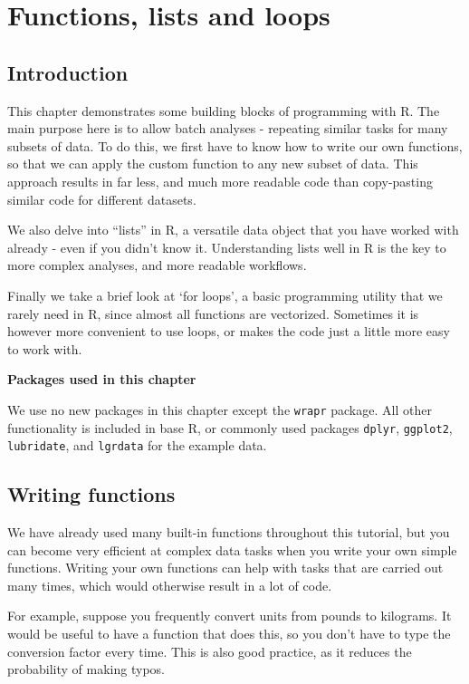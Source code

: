 \documentclass[]{book}
\begin{document}
\hypertarget{programming}{%
\chapter{Functions, lists and loops}\label{programming}}

\hypertarget{introduction-1}{%
\section{Introduction}\label{introduction-1}}

This chapter demonstrates some building blocks of programming with R. The main purpose here is to allow batch analyses - repeating similar tasks for many subsets of data. To do this, we first have to know how to write our own functions, so that we can apply the custom function to any new subset of data. This approach results in far less, and much more readable code than copy-pasting similar code for different datasets.

We also delve into ``lists'' in R, a versatile data object that you have worked with already - even if you didn't know it. Understanding lists well in R is the key to more complex analyses, and more readable workflows.

Finally we take a brief look at `for loops', a basic programming utility that we rarely need in R, since almost all functions are vectorized. Sometimes it is however more convenient to use loops, or makes the code just a little more easy to work with.

\textbf{Packages used in this chapter}

We use no new packages in this chapter except the \texttt{wrapr} package. All other functionality is included in base R, or commonly used packages \texttt{dplyr}, \texttt{ggplot2}, \texttt{lubridate}, and \texttt{lgrdata} for the example data.

\hypertarget{writefunctions}{%
\section{Writing functions}\label{writefunctions}}

We have already used many built-in functions throughout this tutorial, but you can become very efficient at complex data tasks when you write your own simple functions. Writing your own functions can help with tasks that are carried out many times, which would otherwise result in a lot of code.

For example, suppose you frequently convert units from pounds to kilograms. It would be useful to have a function that does this, so you don't have to type the conversion factor every time. This is also good practice, as it reduces the probability of making typos.
\end{document}
